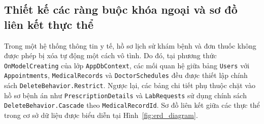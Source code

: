 \subsection{Thiết kế các ràng buộc khóa ngoại và sơ đồ liên kết thực thể}

Trong một hệ thống thông tin y tế, hồ sơ lịch sử khám bệnh và đơn thuốc không được phép bị xóa tự động một cách vô tình. Do đó, tại phương thức \texttt{OnModelCreating} của lớp \texttt{AppDbContext}, các mối quan hệ giữa bảng \texttt{Users} với \texttt{Appointments}, \texttt{MedicalRecords} và \texttt{DoctorSchedules} đều được thiết lập chính sách \texttt{DeleteBehavior.Restrict}. Ngược lại, các bảng chi tiết phụ thuộc chặt vào hồ sơ bệnh án như \texttt{PrescriptionDetails} và \texttt{LabRequests} sử dụng chính sách \texttt{DeleteBehavior.Cascade} theo \texttt{MedicalRecordId}. Sơ đồ liên kết giữa các thực thể trong cơ sở dữ liệu được biểu diễn tại Hình~\ref{fig:erd_diagram}.

